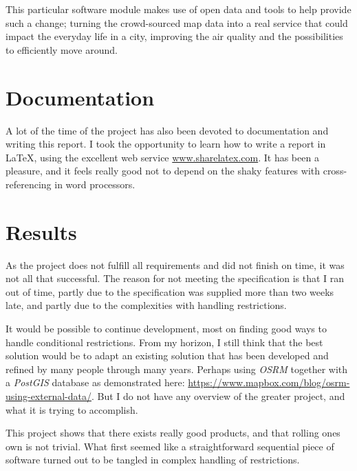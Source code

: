 \documentclass[../main.tex]{subfiles}
\begin{document}
This particular software module makes use of open data and tools to help provide such a change; turning the crowd-sourced map data into a real service that could impact the everyday life in a city, improving the air quality and the possibilities to efficiently move around.


\section{Documentation}
A lot of the time of the project has also been devoted to documentation and writing this report. I took the opportunity to learn how to write a report in \LaTeX, using the excellent web service \url{www.sharelatex.com}. It has been a pleasure, and it feels really good not to depend on the shaky features with cross-referencing in word processors.

\section{Results}
As the project does not fulfill all requirements and did not finish on time, it was not all that successful. The reason for not meeting the specification is that I ran out of time, partly due to the specification was supplied more than two weeks late, and partly due to the complexities with handling restrictions.

It would be possible to continue development, most on finding good ways to handle conditional restrictions. From my horizon, I still think that the best solution would be to adapt an existing solution that has been developed and refined by many people through many years. Perhaps using \textit{OSRM} together with a \textit{PostGIS} database as demonstrated here: \url{https://www.mapbox.com/blog/osrm-using-external-data/}. But I do not have any overview of the greater project, and what it is trying to accomplish.

This project shows that there exists really good products, and that rolling ones own is not trivial. What first seemed like a straightforward sequential piece of software turned out to be tangled in complex handling of restrictions.
\end{document}

